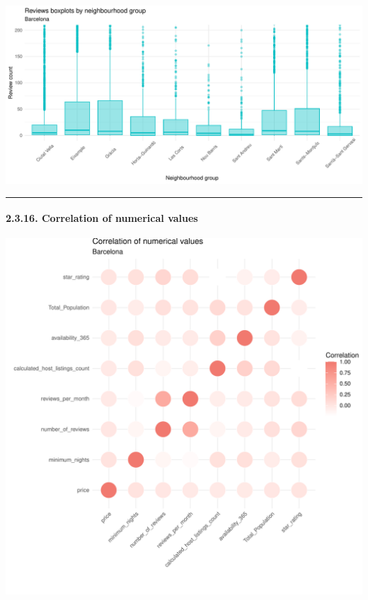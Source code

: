 \documentclass[
]{article}
\begin{document}
\begin{center}\includegraphics{Barcelona-AirBnB-Insights_files/figure-latex/plot15-1} \end{center}

\begin{center}\rule{0.5\linewidth}{0.5pt}\end{center}

\hypertarget{correlation-of-numerical-values}{%
\paragraph{2.3.16. Correlation of numerical
values}\label{correlation-of-numerical-values}}

\begin{center}\includegraphics{Barcelona-AirBnB-Insights_files/figure-latex/plot16-1} \end{center}
\end{document}
